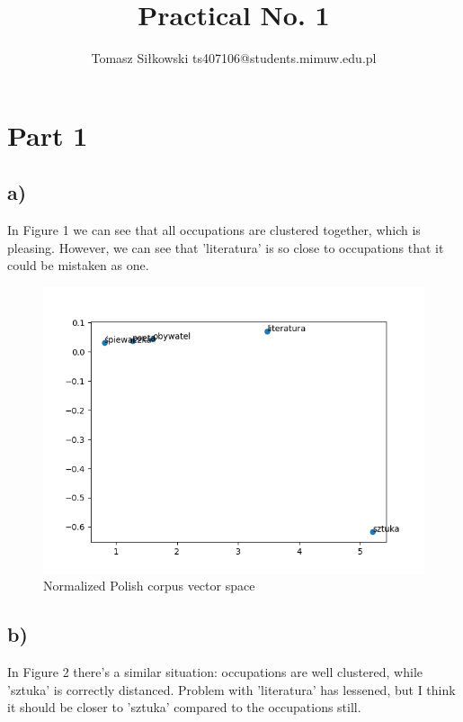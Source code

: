 \documentclass[12pt]{article}
\begin{document}
 
 
\title{Practical No. 1 }%
\author{Tomasz Siłkowski
ts407106@students.mimuw.edu.pl}
 
\maketitle
 
\section{Part 1 }
\subsection*{a) }
In Figure 1 we can see that all occupations are clustered together, which is
pleasing. However, we can see that 'literatura' is so close to occupations 
that it could be mistaken as one.

\begin{figure}[!h]
\centering
\includegraphics[width=0.95\columnwidth]{plot_1e_1.png}
\caption{Normalized Polish corpus vector space}
\label{fig:image}
\end{figure}

\subsection*{b) }
In Figure 2 there's a similar situation: occupations are well clustered,
while 'sztuka' is correctly distanced. Problem with 'literatura' has lessened,
but I think it should be closer to 'sztuka' compared to the occupations still.
\end{document}
